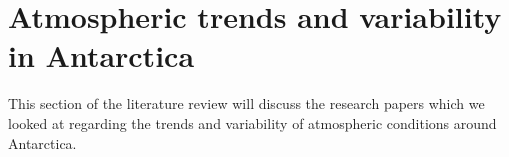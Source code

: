 \documentclass[../main.tex]{subfiles}
\begin{document}
\section{Atmospheric trends and variability in Antarctica}
This section of the literature review will discuss the research papers which we looked at regarding the trends and variability of atmospheric conditions around Antarctica.
\end{document}
